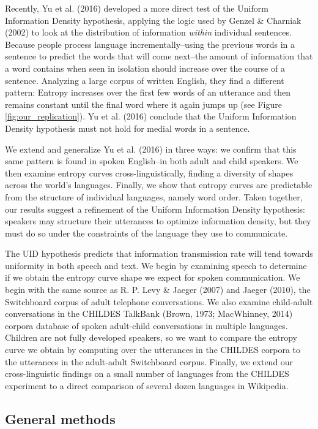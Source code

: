 \documentclass[10pt, letterpaper]{article}
\begin{document}
Recently, Yu et al. (2016) developed a more direct test of the Uniform
Information Density hypothesis, applying the logic used by Genzel \&
Charniak (2002) to look at the distribution of information \emph{within}
individual sentences. Because people process language
incrementally--using the previous words in a sentence to predict the
words that will come next--the amount of information that a word
contains when seen in isolation should increase over the course of a
sentence. Analyzing a large corpus of written English, they find a
different pattern: Entropy increases over the first few words of an
utterance and then remains constant until the final word where it again
jumps up (see Figure \ref{fig:our_replication}). Yu et al. (2016)
conclude that the Uniform Information Density hypothesis must not hold
for medial words in a sentence.

We extend and generalize Yu et al. (2016) in three ways: we confirm that
this same pattern is found in spoken English--in both adult and child
speakers. We then examine entropy curves cross-linguistically, finding a
diversity of shapes across the world's languages. Finally, we show that
entropy curves are predictable from the structure of individual
languages, namely word order. Taken together, our results suggest a
refinement of the Uniform Information Density hypothesis: speakers may
structure their utterances to optimize information density, but they
must do so under the constraints of the language they use to
communicate.

The UID hypothesis predicts that information transmission rate will tend
towards uniformity in both speech and text. We begin by examining speech
to determine if we obtain the entropy curve shape we expect for spoken
communication. We begin with the same source as R. P. Levy \& Jaeger
(2007) and Jaeger (2010), the Switchboard corpus of adult telephone
conversations. We also examine child-adult conversations in the CHILDES
TalkBank (Brown, 1973; MacWhinney, 2014) corpora database of spoken
adult-child conversations in multiple languages. Children are not fully
developed speakers, so we want to compare the entropy curve we obtain by
computing over the utterances in the CHILDES corpora to the utterances
in the adult-adult Switchboard corpus. Finally, we extend our
cross-linguistic findings on a small number of languages from the
CHILDES experiment to a direct comparison of several dozen languages in
Wikipedia.

\subsection{General methods}\label{general-methods}
\end{document}
